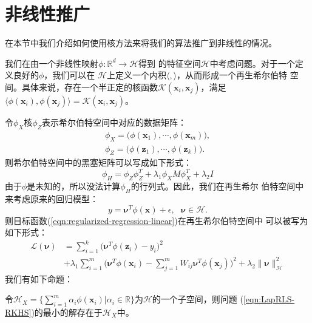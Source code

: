 \section{非线性推广}

在本节中我们介绍如何使用核方法来将我们的算法推广到非线性的情况。

我们在由一个非线性映射$\phi: \mathbb{R}^d \rightarrow \mathcal{H}$得到
的特征空间$\mathcal{H}$中考虑问题。对于一个定义良好的$\phi$，我们可以在
$\mathcal{H}$上定义一个内积$\langle, \rangle$，从而形成一个再生希尔伯特
空间。具体来说，存在一个半正定的核函数$\mathcal{K}(\textbf{x}_i,
\textbf{x}_j)$，满足$\langle\phi(\textbf{x}_i), \phi(\textbf{x}_j)
\rangle = \mathcal{K}(\textbf{x}_i, \textbf{x}_j)$。

令$\phi_X$核$\phi_Z$表示希尔伯特空间中对应的数据矩阵：
\begin{eqnarray*}
\phi_X=\Big(\phi(\textbf{x}_1), \cdots, \phi(\textbf{x}_m)\Big),\\
\phi_Z=\Big(\phi(\textbf{z}_1), \cdots, \phi(\textbf{z}_k)\Big).
\end{eqnarray*}
则希尔伯特空间中的黑塞矩阵可以写成如下形式：
\begin{equation}\label{eqn:hessian-RKHS}
\phi_H=\phi_Z\phi_Z^T +\lambda_1 \phi_X M \phi_X^T + \lambda_2 I
\end{equation}
由于$\phi$是未知的，所以没法计算$\phi_H$的行列式。因此，我们在再生希尔
伯特空间中来考虑原来的回归模型：
\begin{equation}\label{eqn:regression-RKHS}
y=\pmb{\nu}^T \phi(\textbf{x}) + \epsilon, \ \ \
\pmb{\nu}\in\mathcal{H}.
\end{equation}
则目标函数(\ref{eqn:regularized-regression-linear})在再生希尔伯特空间中
可以被写为如下形式：
\begin{align}
\label{eqn:LapRLS-RKHS}
\mathcal{L}(\pmb{\nu}) &=\sum_{i=1}^k \big( \pmb{\nu}^T\phi(\textbf{z}_i) - y_i \big)^2 \nonumber\\
&+\lambda_1 \sum_{i=1}^{m} \big( \pmb{\nu}^T\phi(\textbf{x}_i) -
\sum_{j=1}^m W_{ij}\pmb{\nu}^T\phi(\textbf{x}_j)\big)^2 +\lambda_2
\|\pmb{\nu}\|^2_{\mathcal{H}}
\end{align}
我们有如下命题：
\begin{zjuproposition}
\label{prop:p41}
令$\mathcal{H}_X=\{ \sum_{i=1}^m \alpha_i \phi(\textbf{x}_i) |
\alpha_i \in \mathbb{R}\}$为$\mathcal{H}$的一个子空间，则问题
(\ref{eqn:LapRLS-RKHS})的最小的解存在于$\mathcal{H}_X$中。
\end{zjuproposition}
